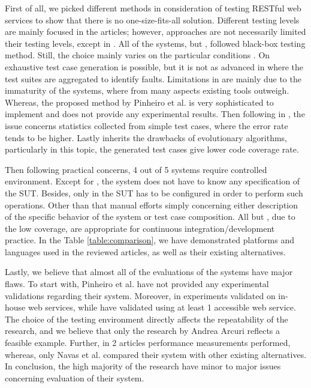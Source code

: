\documentclass[english]{tktltiki}
\begin{document}
First of all, we picked different methods in consideration of testing RESTful web services to show that there is no one-size-fits-all solution. Different testing levels are mainly focused in the articles; however, approaches are not necessarily limited their testing levels, except in \cite{chakrabarti2010connectedness}. All of the systems, but \cite{arcuri2017restful}, followed black-box testing method. Still, the choice mainly varies on the particular conditions \cite{canfora2009service}. On \cite{chakrabarti2009test, chakrabarti2010connectedness, pinheiro2013model} exhaustive test case generation is possible, but it is not as advanced in \cite{arcuri2017restful} where the test suites are aggregated to identify faults. Limitations in \cite{chakrabarti2009test, chakrabarti2010connectedness} are mainly due to the immaturity of the systems, where from many aspects existing tools outweigh. Whereas, the proposed method by Pinheiro et al. \cite{pinheiro2013model} is very sophisticated to implement and does not provide any experimental results. Then following in \cite{navas2014rest}, the issue concerns statistics collected from simple test cases, where the error rate tends to be higher. Lastly \cite{arcuri2017restful} inherits the drawbacks of evolutionary algorithms, particularly in this topic, the generated test cases give lower code coverage rate.

Then following practical concerns, 4 out of 5 systems require controlled environment. Except for \cite{navas2014rest}, the system does not have to know any specification of the SUT. Besides, only in \cite{arcuri2017restful} the SUT has to be configured in order to perform such operations. Other than that manual efforts simply concerning either description of the specific behavior of the system or test case composition. All but \cite{arcuri2017restful}, due to the low coverage, are appropriate for continuous integration/development practice. In the Table \ref{table:comparison}, we have demonstrated platforms and languages used in the reviewed articles, as well as their existing alternatives.

Lastly, we believe that almost all of the evaluations of the systems have major flaws. To start with, Pinheiro et al. \cite{pinheiro2013model} have not provided any experimental validations regarding their system. Moreover, in \cite{chakrabarti2009test, chakrabarti2010connectedness} experiments validated on in-house web services, while \cite{navas2014rest, arcuri2017restful} have validated using at least 1 accessible web service. The choice of the testing environment directly affects the repeatability of the research, and we believe that only the research by Andrea Arcuri \cite{arcuri2017restful} reflects a feasible example. Further, in 2 articles \cite{chakrabarti2009test, arcuri2017restful} performance measurements performed, whereas, only Navas et al. \cite{navas2014rest} compared their system with other existing alternatives. In conclusion, the high majority of the research have minor to major issues concerning evaluation of their system.
\end{document}
